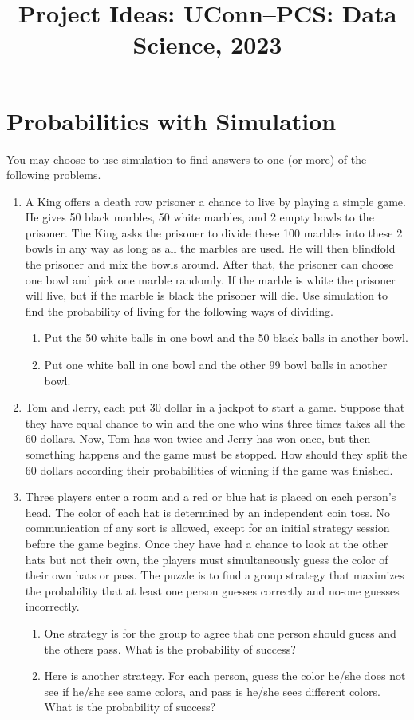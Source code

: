 \documentclass[12pt]{article}
\title{Project Ideas: UConn--PCS: Data Science, 2023}
\begin{document}
\maketitle

\section{Probabilities with Simulation}
You may choose to use simulation to find answers to one (or more) of the
following problems.

\begin{enumerate}[1.]
\item A King offers a death row prisoner a chance to live by playing a simple
  game. He gives 50 black marbles, 50 white marbles, and 2 empty bowls to the
  prisoner. The King asks the prisoner to divide these 100 marbles into these 2
  bowls in any way as long as all the marbles are used. He will then blindfold
  the prisoner and mix the bowls around. After that, the prisoner can choose one
  bowl and pick one marble randomly.  If the marble is white the prisoner will
  live, but if the marble is black the prisoner will die. Use simulation to find
  the probability of living for the following ways of dividing.
  \begin{enumerate}
  \item Put the 50 white balls in one bowl and the 50 black balls in another
    bowl.
  \item Put one white ball in one bowl and the other 99 bowl balls in another
    bowl.
  \end{enumerate}
  
\item Tom and Jerry, each put 30 dollar in a jackpot to start a game. Suppose
  that they have equal chance to win and the one who wins three times takes all
  the 60 dollars. Now, Tom has won twice and Jerry has won once, but then
  something happens and the game must be stopped. How should they split the 60
  dollars according their probabilities of winning if the game was finished.

\item Three players enter a room and a red or blue hat is placed on each
  person's head.  The color of each hat is determined by an independent coin
  toss. No communication of any sort is allowed, except for an initial strategy
  session before the game begins.  Once they have had a chance to look at the
  other hats but not their own, the players must simultaneously guess the
  color of their own hats or pass. The puzzle is to find a group strategy that
  maximizes the probability that at least one person guesses correctly and
  no-one guesses incorrectly.
  \begin{enumerate}
  \item One strategy is for the group to agree that one person should guess and
    the others pass. What is the probability of success?
  \item Here is another strategy. For each person, guess the color he/she does
    not see if he/she see same colors, and pass is he/she sees different
    colors. What is the probability of success?
  \end{enumerate}
  

\end{enumerate}
\end{document}
